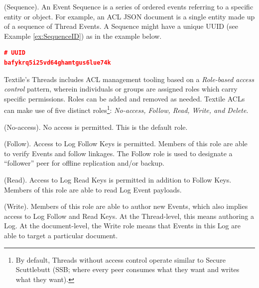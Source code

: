 \documentclass{textile}
\begin{document}
\begin{definition}
(Sequence). An Event Sequence is a series of ordered events referring to a specific entity or object. For example, an ACL JSON document is a single entity made up of a sequence of Thread Events. A Sequence might have a unique UUID (see Example \ref{ex:SequenceID}) as in the example below.
\end{definition}

\begin{example}[!b]
\centering
\begin{lstlisting}[language=json,firstnumber=1]
# UUID
bafykrq5i25vd64ghamtgus6lue74k
\end{lstlisting}
  \caption{Sequence ID.}
  \label{ex:SequenceID}
\end{example}

Textile's Threads includes ACL management tooling based on a \emph{Role-based access control} \cite{sandhuRolebasedAccessControl1996} pattern, wherein individuals or groups are assigned roles which carry specific permissions. Roles can be added and removed as needed. Textile ACLs can make use of five distinct roles\footnote{By default, Threads without access control operate similar to Secure Scuttlebutt (SSB; where every peer consumes what they want and writes what they want).}: \emph{No-access, Follow, Read, Write, and Delete}.

\begin{definition}
(No-access). No access is permitted. This is the default role.
\end{definition}

\begin{definition}
(Follow). Access to Log Follow Keys is permitted. Members of this role are able to verify Events and follow linkages. The Follow role is used to designate a ``follower'' peer for offline replication and/or backup.
\end{definition}

\begin{definition}
(Read). Access to Log Read Keys is permitted in addition to Follow Keys. Members of this role are able to read Log Event payloads.
\end{definition}

\begin{definition}
(Write). Members of this role are able to author new Events, which also implies access to Log Follow and Read Keys. At the Thread-level, this means authoring a Log. At the document-level, the Write role means that Events in this Log are able to target a particular document.
\end{definition}
\end{document}
